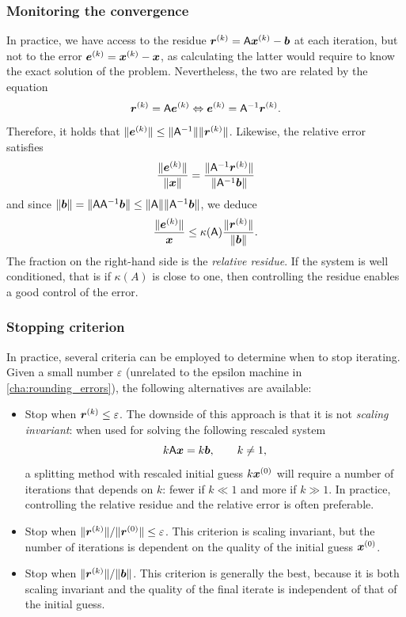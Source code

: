 \subsubsection{Monitoring the convergence}
\label{ssub:monitoring_the_convergence}
In practice,
we have access to the residue $\mathbf{\boldsymbol{r}}^{(k)} = \mathsf A \mathbf{\boldsymbol{x}}^{(k)} - \mathbf{\boldsymbol{b}}$ at each iteration,
but not to the error $\mathbf{\boldsymbol{e}}^{(k)} = \mathbf{\boldsymbol{x}}^{(k)} - \mathbf{\boldsymbol{x}}$,
as calculating the latter would require to know the exact solution of the problem.
Nevertheless,
the two are related by the equation
\[
    \mathbf{\boldsymbol{r}}^{(k)} = \mathsf A \mathbf{\boldsymbol{e}}^{(k)}
    \Leftrightarrow \mathbf{\boldsymbol{e}}^{(k)} = \mathsf A^{-1} \mathbf{\boldsymbol{r}}^{(k)}.
\]
Therefore, it holds that $\lVert\mathbf{\boldsymbol{e}}^{(k)}\rVert \leq \lVert\mathsf A^{-1}\rVert \lVert\mathbf{\boldsymbol{r}}^{(k)}\rVert$.
Likewise, the relative error satisfies
\[
     \frac{\lVert\mathbf{\boldsymbol{e}}^{(k)}\rVert}{\lVert\mathbf{\boldsymbol{x}}\rVert}
     = \frac{\lVert\mathsf A^{-1} \mathbf{\boldsymbol{r}}^{(k)}\rVert}{\lVert\mathsf A^{-1} \mathbf{\boldsymbol{b}}\rVert}
\]
and since $\lVert\mathbf{\boldsymbol{b}}\rVert = \lVert\mathsf A \mathsf A^{-1} \mathbf{\boldsymbol{b}}\rVert \leq \lVert\mathsf A\rVert \lVert\mathsf A^{-1} \mathbf{\boldsymbol{b}}\rVert$,
we deduce
\[
     \frac{\lVert\mathbf{\boldsymbol{e}}^{(k)}\rVert}{\mathbf{\boldsymbol{x}}}
     \leq \kappa(\mathsf A) \frac{\lVert\mathbf{\boldsymbol{r}}^{(k)}\rVert}{\lVert\mathbf{\boldsymbol{b}}\rVert}.
\]
The fraction on the right-hand side is the \emph{relative residue}.
If the system is well conditioned,
that is if $\kappa(A)$ is close to one,
then controlling the residue enables a good control of the error.

\subsubsection{Stopping criterion}%
\label{ssub:stopping_criterion}

In practice,
several criteria can be employed to determine when to stop iterating.
Given a small number $\varepsilon$ (unrelated to the epsilon machine in \cref{cha:rounding_errors}),
the following alternatives are available:
\begin{itemize}
    \item
        Stop when $\mathbf{\boldsymbol{r}}^{(k)} \leq \varepsilon$.
        The downside of this approach is that
        it is not \emph{scaling invariant}:
        when used for solving the following rescaled system
        \[
            k \mathsf A \mathbf{\boldsymbol{x}} = k \mathbf{\boldsymbol{b}}, \qquad k \neq 1,
        \]
        a splitting method with rescaled initial guess $k \mathbf{\boldsymbol{x}}^{(0)}$
        will require a number of iterations that depends on $k$:
        fewer if $k \ll 1$ and more if $k \gg 1$.
        In practice, controlling the relative residue and the relative error is often preferable.

    \item
        Stop when $\lVert\mathbf{\boldsymbol{r}}^{(k)}\rVert / \lVert\mathbf{\boldsymbol{r}}^{(0)}\rVert \leq \varepsilon$.
        This criterion is scaling invariant,
        but the number of iterations is dependent on the quality of the initial guess $\mathbf{\boldsymbol{x}}^{(0)}$.

    \item
        Stop when $\lVert\mathbf{\boldsymbol{r}}^{(k)}\rVert / \lVert\mathbf{\boldsymbol{b}}\rVert$.
        This criterion is generally the best,
        because it is both scaling invariant and the quality of the final iterate is independent of that of the initial guess.
\end{itemize}

